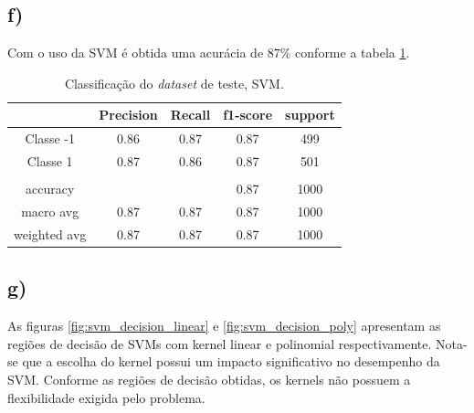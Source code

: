 \documentclass{article}
\begin{document}
    \subsection*{f)}
    Com o uso da SVM é obtida uma acurácia de $87\%$ conforme a tabela \ref{tbl:svm_test}.
    \begin{table}[H]
        \begin{tabular}{c|c|c|c|c|}
        \cline{2-5}
                                        & \textbf{Precision} & \textbf{Recall} & \textbf{f1-score} & \textbf{support} \\ \hline
        \multicolumn{1}{|c|}{Classe -1}    & 0.86               & 0.87            & 0.87              & 499              \\ \hline
        \multicolumn{1}{|c|}{Classe 1}     & 0.87               & 0.86            & 0.87              & 501              \\ \hline
        \multicolumn{1}{|c|}{}             &                    &                 &                   &                  \\ \hline
        \multicolumn{1}{|c|}{accuracy}     &                    &                 & 0.87              & 1000             \\ \hline
        \multicolumn{1}{|c|}{macro avg}    & 0.87               & 0.87            & 0.87              & 1000             \\ \hline
        \multicolumn{1}{|c|}{weighted avg} & 0.87               & 0.87            & 0.87              & 1000             \\ \hline
        \end{tabular}
        \caption{Classificação do \textit{dataset} de teste, SVM.}
        \label{tbl:svm_test}
    \end{table} 
    \subsection*{g)}
    As figuras \ref{fig:svm_decision_linear} e \ref{fig:svm_decision_poly} apresentam
    as regiões de decisão de SVMs com kernel linear e polinomial respectivamente. Nota-se
    que a escolha do kernel possui um impacto significativo no desempenho da SVM. Conforme as
    regiões de decisão obtidas, os kernels não possuem a flexibilidade exigida pelo problema.
    
\end{document}
